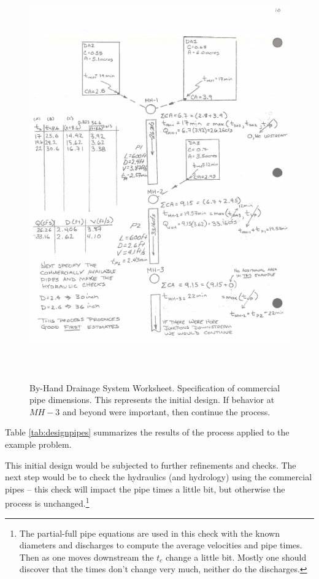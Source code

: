 \documentclass[12pt]{article}
\begin{document}
\begin{figure}[ht!] %
\centering
   \includegraphics[height=7in]{DrainageLayout10.jpg}
   \caption{By-Hand Drainage System Worksheet. Specification of commercial pipe dimensions.  This represents the initial design.  If behavior at $MH-3$ and beyond were important, then continue the process.}
   \label{fig:DrainageLayout10} 
\end{figure}

Table \ref{tab:designpipes} summarizes the results of the process applied to the example problem. 

This initial design would be subjected to further refinements and checks.
The next step would be to check the hydraulics (and hydrology) using the commercial pipes -- this check will impact the pipe times a little bit, but otherwise the process is unchanged.\footnote{The partial-full pipe equations are used in this check with the known diameters and discharges to compute the average velocities and pipe times.  Then as one moves downstream the $t_c$ change a little bit.  Mostly one should discover that the times don't change very much, neither do the discharges.}
\end{document}

